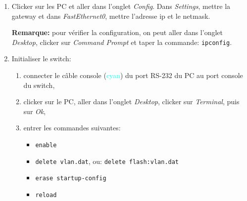 \documentclass[a4paper]{article}
\begin{document}
\begin{enumerate}





\item Clicker sur les PC et aller dans l'onglet \textit{Config}. Dans \textit{Settings}, mettre la gateway et dans \textit{FastEthernet0}, mettre l'adresse ip et le netmask.
\begin{example}
    \textbf{Remarque:} pour vérifier la configuration, on peut aller dans l'onglet \textit{Desktop}, clicker sur \textit{Command Prompt} et taper la commande: \texttt{ipconfig}.
\end{example}





\item Initialiser le switch:
\begin{enumerate}
    \item connecter le câble console (\textcolor{cyan}{cyan}) du port RS-232 du PC au port console du switch,
    \item clicker sur le PC, aller dans l'onglet \textit{Desktop}, clicker sur \textit{Terminal}, puis sur \textit{Ok},
    \item entrer les commandes suivantes:
    \begin{itemize}
        \item \texttt{enable}
        \item \texttt{delete vlan.dat}, ou: \texttt{delete flash:vlan.dat}
        \item \texttt{erase startup-config}
        \item \texttt{reload}
    \end{itemize}
\end{enumerate}






\end{enumerate}
\end{document}

